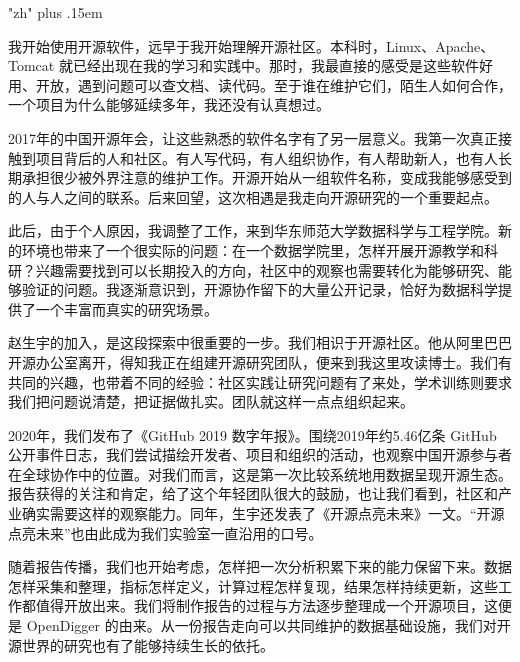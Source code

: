 \begingroup
\XeTeXlinebreaklocale "zh"
\XeTeXlinebreakskip=0pt plus .15em
\ChineseBody\fontsize{11}{19}\selectfont
\setlength{\parindent}{2em}\setlength{\parskip}{3pt plus .3pt}
\thispagestyle{opening}
\label{origins:zh}
\par
\vspace{10pt}
\par
\vspace{17pt}
我开始使用开源软件，远早于我开始理解开源社区。本科时，Linux、Apache、Tomcat 就已经出现在我的学习和实践中。那时，我最直接的感受是这些软件好用、开放，遇到问题可以查文档、读代码。至于谁在维护它们，陌生人如何合作，一个项目为什么能够延续多年，我还没有认真想过。

2017年的中国开源年会，让这些熟悉的软件名字有了另一层意义。我第一次真正接触到项目背后的人和社区。有人写代码，有人组织协作，有人帮助新人，也有人长期承担很少被外界注意的维护工作。开源开始从一组软件名称，变成我能够感受到的人与人之间的联系。后来回望，这次相遇是我走向开源研究的一个重要起点。

此后，由于个人原因，我调整了工作，来到华东师范大学数据科学与工程学院。新的环境也带来了一个很实际的问题：在一个数据学院里，怎样开展开源教学和科研？兴趣需要找到可以长期投入的方向，社区中的观察也需要转化为能够研究、能够验证的问题。我逐渐意识到，开源协作留下的大量公开记录，恰好为数据科学提供了一个丰富而真实的研究场景。

赵生宇的加入，是这段探索中很重要的一步。我们相识于开源社区。他从阿里巴巴开源办公室离开，得知我正在组建开源研究团队，便来到我这里攻读博士。我们有共同的兴趣，也带着不同的经验：社区实践让研究问题有了来处，学术训练则要求我们把问题说清楚，把证据做扎实。团队就这样一点点组织起来。

2020年，我们发布了《GitHub 2019 数字年报》。围绕2019年约5.46亿条 GitHub 公开事件日志，我们尝试描绘开发者、项目和组织的活动，也观察中国开源参与者在全球协作中的位置。对我们而言，这是第一次比较系统地用数据呈现开源生态。报告获得的关注和肯定，给了这个年轻团队很大的鼓励，也让我们看到，社区和产业确实需要这样的观察能力。同年，生宇还发表了《开源点亮未来》一文。“开源点亮未来”也由此成为我们实验室一直沿用的口号。

随着报告传播，我们也开始考虑，怎样把一次分析积累下来的能力保留下来。数据怎样采集和整理，指标怎样定义，计算过程怎样复现，结果怎样持续更新，这些工作都值得开放出来。我们将制作报告的过程与方法逐步整理成一个开源项目，这便是 OpenDigger 的由来。从一份报告走向可以共同维护的数据基础设施，我们对开源世界的研究也有了能够持续生长的依托。

